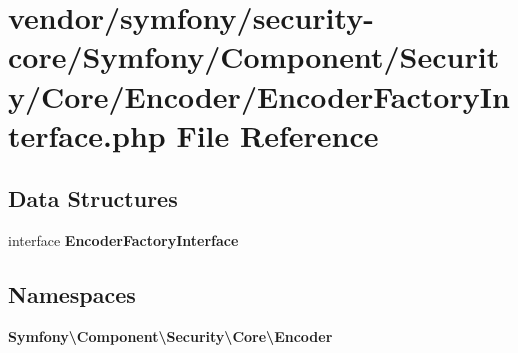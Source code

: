 \section{vendor/symfony/security-\/core/\+Symfony/\+Component/\+Security/\+Core/\+Encoder/\+Encoder\+Factory\+Interface.php File Reference}
\label{_encoder_factory_interface_8php}
\subsection*{Data Structures}
\begin{DoxyCompactItemize}
\item 
interface {\bf Encoder\+Factory\+Interface}
\end{DoxyCompactItemize}
\subsection*{Namespaces}
\begin{DoxyCompactItemize}
\item 
 {\bf Symfony\textbackslash{}\+Component\textbackslash{}\+Security\textbackslash{}\+Core\textbackslash{}\+Encoder}
\end{DoxyCompactItemize}
